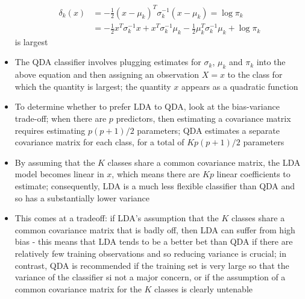 \documentclass[12pt]{article}
\begin{document}
\begin{itemize}
$$\begin{aligned}
\delta_k(x) &= -\frac{1}{2}(x-\mu_k)^T\sigma_k^{-1}(x-\mu_k) = \log \pi_k \\ &= -\frac{1}{2}x^T\sigma_k^{-1}x + x^T\sigma_k^{-1}\mu_k - \frac{1}{2}\mu_k^T\sigma_k^{-1}\mu_k + \log \pi_k \end{aligned} $$ is largest 
\item The QDA classifier involves plugging estimates for $\sigma_k$, $\mu_k$ and $\pi_k$ into the above equation and then assigning an observation $X=x$ to the class for which the quantity is largest; the quantity $x$ appears as a quadratic function 
\item To determine whether to prefer LDA to QDA, look at the bias-variance trade-off; when there are $p$ predictors, then estimating a covariance matrix requires estimating $p(p+1)/2$ parameters; QDA estimates a separate covariance matrix for each class, for a total of $Kp(p+1)/2$ parameters 
\item By assuming that the $K$ classes share a common covariance matrix, the LDA model becomes linear in $x$, which means there are $Kp$ linear coefficients to estimate; consequently, LDA is a much less flexible classifier than QDA and so has a substantially lower variance 
\item This comes at a tradeoff: if LDA's assumption that the $K$ classes share a common covariance matrix that is badly off, then LDA can suffer from high bias - this means that LDA tends to be a better bet than QDA if there are relatively few training observations and so reducing variance is crucial; in contrast, QDA is recommended if the training set is very large so that the variance of the classifier si not a major concern, or if the assumption of a common covariance matrix for the $K$ classes is clearly untenable 
\end{itemize}
\end{document}
